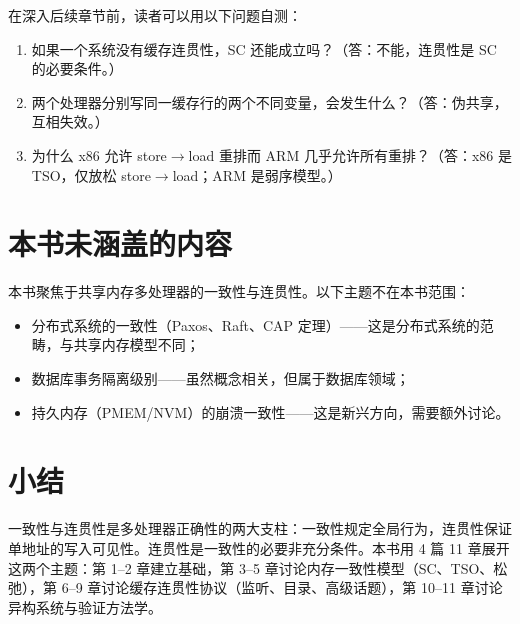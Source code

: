 在深入后续章节前，读者可以用以下问题自测：

\begin{enumerate}
\item 如果一个系统没有缓存连贯性，SC 还能成立吗？（答：不能，连贯性是 SC 的必要条件。）
\item 两个处理器分别写同一缓存行的两个不同变量，会发生什么？（答：伪共享，互相失效。）
\item 为什么 x86 允许 store$\rightarrow$load 重排而 ARM 几乎允许所有重排？（答：x86 是 TSO，仅放松 store$\rightarrow$load；ARM 是弱序模型。）
\end{enumerate}


\section{本书未涵盖的内容}

本书聚焦于共享内存多处理器的一致性与连贯性。以下主题不在本书范围：

\begin{itemize}
\item 分布式系统的一致性（Paxos、Raft、CAP 定理）——这是分布式系统的范畴，与共享内存模型不同；
\item 数据库事务隔离级别——虽然概念相关，但属于数据库领域；
\item 持久内存（PMEM/NVM）的崩溃一致性——这是新兴方向，需要额外讨论。
\end{itemize}


\section{小结}

一致性与连贯性是多处理器正确性的两大支柱：一致性规定全局行为，连贯性保证单地址的写入可见性。连贯性是一致性的必要非充分条件。本书用 4 篇 11 章展开这两个主题：第 1–2 章建立基础，第 3–5 章讨论内存一致性模型（SC、TSO、松弛），第 6–9 章讨论缓存连贯性协议（监听、目录、高级话题），第 10–11 章讨论异构系统与验证方法学。

